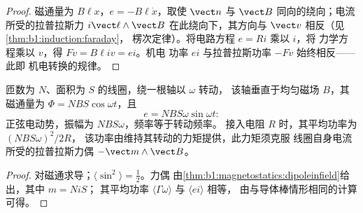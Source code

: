 \begin{proof}
磁通量为 $B\ell x$，$e = -B\ell\dot x$，取使 $\vect n$
与 $\vect B$ 同向的绕向；电流所受的拉普拉斯力 $i\vect\ell\wedge\vect B$
在此绕向下，其方向与 $\vect v$ 相反（见\cref{thm:b1:induction:faraday}，
楞次定律）。将电路方程 $e = Ri$ 乘以 $i$，将
力学方程乘以 $v$，得 $Fv = B\ell iv = ei$。机电
功率 $ei$ 与拉普拉斯功率 $-Fv$ 始终相反——此即
机电转换的规律。
\end{proof}

\begin{proposition}\label{prop:b1:induction:alternator}
匝数为 $N$、面积为 $S$ 的线圈，绕一根轴以 $\omega$ 转动，
该轴垂直于均匀磁场 $B$，其磁通量为 $\Phi = NBS\cos\omega t$，且
\[
e = NBS\omega\sin\omega t :
\]
正弦电动势，振幅为 $NBS\omega$，频率等于转动频率。
接入电阻 $R$ 时，其平均功率为 $(NBS\omega)^2/2R$，
该功率由维持其转动的力矩提供，此力矩须克服
线圈自身电流所受的拉普拉斯力偶 $-\vect m\wedge\vect B$。
\end{proposition}

\begin{proof}
对磁通求导；$\langle\sin^2\rangle = \tfrac12$。力偶
由\cref{thm:b1:magnetostatics:dipoleinfield}给出，其中 $m = Ni S$；
其平均功率 $\langle\Gamma\omega\rangle$ 与 $\langle ei\rangle$ 相等，
由与导体棒情形相同的计算可得。
\end{proof}

